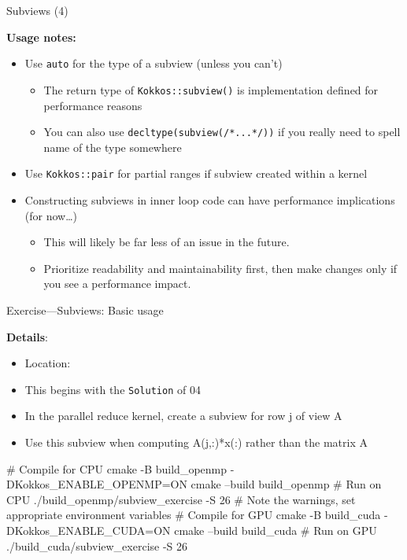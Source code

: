 \begin{frame}[fragile]{Subviews (4)}

  \textbf{Usage notes:}


  \begin{itemize}
    \item{Use \texttt{auto} for the type of a subview (unless you can't)}
      \pause
  \begin{itemize}
      \pause
    \item{The return type of \texttt{Kokkos::subview()} is implementation defined for performance reasons}
      \pause
    \item{You can also use \texttt{decltype(subview(/*...*/))} if you really need to spell name of the type somewhere}
  \end{itemize}
      \pause
    \item{Use \texttt{Kokkos::pair} for partial ranges if subview created within a kernel}
      \pause
    \item{Constructing subviews in inner loop code can have performance implications (for now\dots)}
      \pause
    \begin{itemize}
      \item{This will likely be far less of an issue in the future.}
      \pause
      \item{Prioritize readability and maintainability first, then make changes only if you see a performance impact.}
      \pause
    \end{itemize}
  \end{itemize}

\end{frame}


\begin{frame}[fragile]{Exercise---Subviews: Basic usage}

  \textbf{Details}:
  \begin{small}
  \begin{itemize}
    \item Location: 
    \item This begins with the \texttt{Solution} of 04
    \item In the parallel reduce kernel, create a subview for row j of view A
    \item Use this subview when computing A(j,:)*x(:) rather than the matrix A
  \end{itemize}
  \end{small}

\begin{code}
  # Compile for CPU
  cmake -B build_openmp -DKokkos_ENABLE_OPENMP=ON
  cmake --build build_openmp
  # Run on CPU
  ./build_openmp/subview_exercise -S 26
  # Note the warnings, set appropriate environment variables
  # Compile for GPU
  cmake -B build_cuda -DKokkos_ENABLE_CUDA=ON
  cmake --build build_cuda
  # Run on GPU
  ./build_cuda/subview_exercise -S 26
\end{code}

\end{frame}

